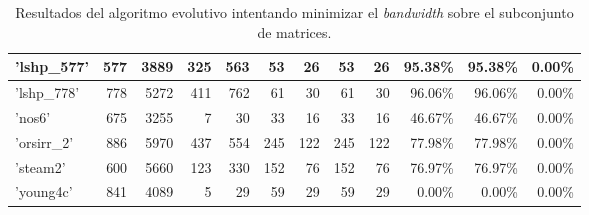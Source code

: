 \begin{table}[h]
{\begin{tabular}{|l|r|r|r|r|r|r|r|r|r|r|r|}
\hline
'lshp\_577'                   & 577                                                     & 3889                                                & 325                     & 563                     & 53                      & 26                      & 53                      & 26                      & 95.38\%                             & 95.38\%                            & 0.00\%                         \\ 
\hline
'lshp\_778'                   & 778                                                     & 5272                                                & 411                     & 762                     & 61                      & 30                      & 61                      & 30                      & 96.06\%                             & 96.06\%                            & 0.00\%                         \\ 
\hline
'nos6'                        & 675                                                     & 3255                                                & 7                       & 30                      & 33                      & 16                      & 33                      & 16                      & 46.67\%                             & 46.67\%                            & 0.00\%                         \\ 
\hline
'orsirr\_2'                   & 886                                                     & 5970                                                & 437                     & 554                     & 245                     & 122                     & 245                     & 122                     & 77.98\%                             & 77.98\%                            & 0.00\%                         \\ 
\hline
'steam2'                      & 600                                                     & 5660                                                & 123                     & 330                     & 152                     & 76                      & 152                     & 76                      & 76.97\%                             & 76.97\%                            & 0.00\%                         \\ 
\hline
'young4c'                     & 841                                                     & 4089                                                & 5                       & 29                      & 59                      & 29                      & 59                      & 29                      & 0.00\%                              & 0.00\%                             & 0.00\%                         \\
\hline
\end{tabular}
}
\caption{Resultados del algoritmo evolutivo intentando minimizar el \textit{bandwidth} sobre el subconjunto de matrices.}
\label{tab:band-reduction-ag-results}
\end{table}

